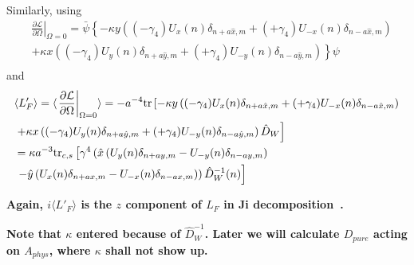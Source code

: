 Similarly, using
\begin{equation}
\begin{split}
&\left.\frac{\partial \mathcal{L}}{\partial \Omega}\right|_{\Omega=0}=\bar{\psi}\left\{-\kappa y \left((-\gamma _4)U_{x}(n)\delta _{n+a\hat{x},m}+(+\gamma _4)U_{-x}(n)\delta _{n-a\hat{x},m}\right)\right.\\
&\left.+\kappa x \left((-\gamma _4)U_{y}(n)\delta _{n+a\hat{y},m}+(+\gamma _4)U_{-y}(n)\delta _{n-a\hat{y},m}\right)\right\}\psi\\
\end{split}
\end{equation}
and
\begin{equation}
\begin{split}
&\langle L'_F\rangle =\langle \left.\frac{\partial \mathcal{L}}{\partial \Omega}\right|_{\Omega=0} \rangle=-a^{-4}{\rm tr}\left[-\kappa y \left((-\gamma _4)U_{x}(n)\delta _{n+a\hat{x},m}+(+\gamma _4)U_{-x}(n)\delta _{n-a\hat{x},m}\right)\right.\\
&\left.+\kappa x \left((-\gamma _4)U_{y}(n)\delta _{n+a\hat{y},m}+(+\gamma _4)U_{-y}(n)\delta _{n-a\hat{y},m}\right)\hat{D}_{W}\right]\\
&=\kappa a^{-3} {\rm tr}_{c,s}\left[\gamma ^4 \left(\hat{x} \left(U_y(n)\delta _{n+ay,m}-U_{-y}(n)\delta _{n-ay,m}\right)\right.\right.\\
&\left.\left.-\hat{y} \left(U_{x}(n)\delta _{n+ax,m}-U_{-x}(n)\delta _{n-ax,m}\right)\right)\hat{D}_W^{-1}(n)\right]\\
\end{split}
\end{equation}

\textbf{Again, $i\langle L'_F\rangle $ is the $z$ component of $L_F$ in Ji decomposition~\cite{AngularMomentum}.}

\textbf{Note that $\kappa$ entered because of $\hat{D}_W^{-1}$. Later we will calculate $D_{pure}$ acting on $A_{phys}$, where $\kappa$ shall not show up.}

